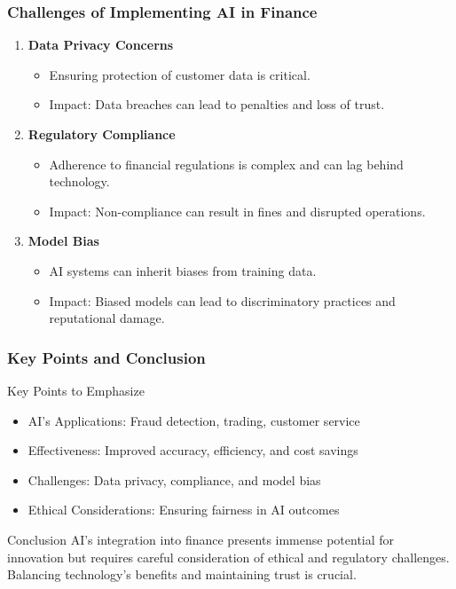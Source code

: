 \documentclass{beamer}
\begin{document}
\begin{frame}[fragile]
    \frametitle{Challenges of Implementing AI in Finance}
    \begin{enumerate}
        \item \textbf{Data Privacy Concerns}
            \begin{itemize}
                \item Ensuring protection of customer data is critical.
                \item Impact: Data breaches can lead to penalties and loss of trust.
            \end{itemize}

        \item \textbf{Regulatory Compliance}
            \begin{itemize}
                \item Adherence to financial regulations is complex and can lag behind technology.
                \item Impact: Non-compliance can result in fines and disrupted operations.
            \end{itemize}

        \item \textbf{Model Bias}
            \begin{itemize}
                \item AI systems can inherit biases from training data.
                \item Impact: Biased models can lead to discriminatory practices and reputational damage.
            \end{itemize}
    \end{enumerate}
\end{frame}

\begin{frame}[fragile]
    \frametitle{Key Points and Conclusion}
    \begin{block}{Key Points to Emphasize}
        \begin{itemize}
            \item AI's Applications: Fraud detection, trading, customer service
            \item Effectiveness: Improved accuracy, efficiency, and cost savings
            \item Challenges: Data privacy, compliance, and model bias
            \item Ethical Considerations: Ensuring fairness in AI outcomes
        \end{itemize}
    \end{block}

    \begin{block}{Conclusion}
        AI's integration into finance presents immense potential for innovation but requires careful consideration of ethical and regulatory challenges. Balancing technology's benefits and maintaining trust is crucial.
    \end{block}
\end{frame}
\end{document}
